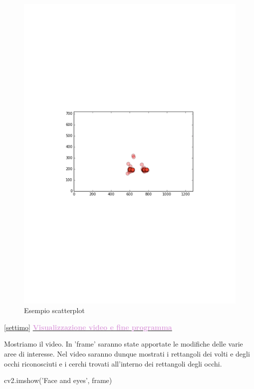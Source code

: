 \documentclass[12pt]{article}
\begin{document}
{\begin{figure}[htbp]
\centering
\includegraphics{scatter}
\caption{Esempio scatterplot}
\end{figure}
\vspace{1cm}


\ref {settimo} \underline{\textbf{\textcolor{Plum}{Visualizzazione video e fine programma}}}
\vspace{1cm}

Mostriamo il video. In 'frame' saranno state apportate le modifiche delle varie aree di interesse. Nel video saranno dunque mostrati i rettangoli dei volti e degli occhi riconosciuti e i cerchi trovati all'interno dei rettangoli degli occhi.
\vspace{1cm}
 \begin{codice}
    cv2.imshow('Face and eyes', frame)
\end{codice}
\vspace{1cm}

}
\end{document}
